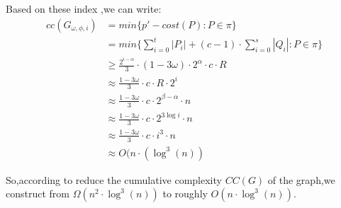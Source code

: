 Based on these index ,we can write:
\begin{equation}
\begin{aligned}
  cc(G_{\omega,\phi,i})&=min\{p'-cost(P):P \in \pi \}\\
  &=min\{\sum\limits_{i=0}^t|P_i|+(c-1)\cdot\sum\limits_{i=0}^s|Q_i|:P \in \pi \}\\
  &\ge\frac{2^{i-\alpha}}{3}\cdot(1-3\omega)\cdot2^{\alpha}\cdot c\cdot R \\
  &\approx \frac{1-3\omega}{3}\cdot c\cdot R\cdot2^i\\
  &\approx \frac{1-3\omega}{3}\cdot c \cdot2^{\beta-\alpha}\cdot n \\
  &\approx \frac{1-3\omega}{3}\cdot c\cdot2^{3\log i}\cdot n \\
  &\approx \frac{1-3\omega}{3}\cdot c\cdot i^3\cdot n \\
  &\approx O(n\cdot(\log^3(n))
\end{aligned}
\end{equation}

So,according to reduce the cumulative complexity $CC(G)$ of the graph,we construct from $\Omega(n^2 \cdot \log^3(n))$ to roughly $O(n \cdot \log^3(n))$.